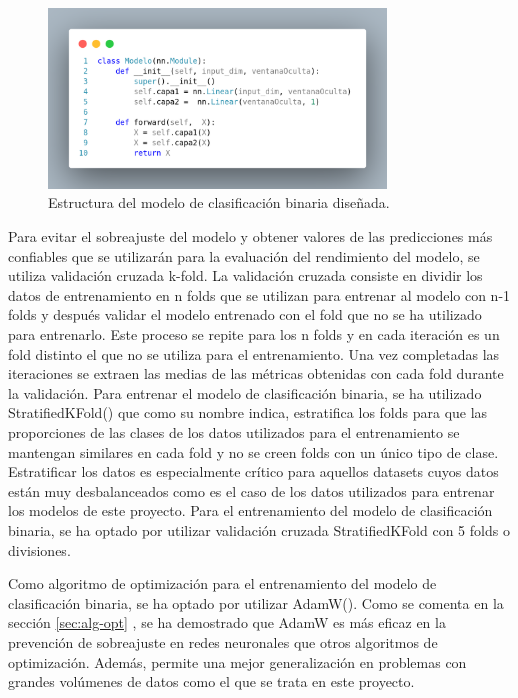 \begin{figure}[H]
    \centering
    \includegraphics[width=0.8\textwidth]{./img/modelo/modeloBIN.png}
    \caption{Estructura del modelo de clasificación binaria diseñada.}
    \label{fig:modBIN}
\end{figure}

Para evitar el sobreajuste del modelo y obtener valores de las predicciones más confiables que se utilizarán para la evaluación del rendimiento del modelo, se utiliza validación cruzada k-fold. La validación cruzada consiste en dividir los datos de entrenamiento en n folds que se utilizan para entrenar al modelo con n-1 folds y después validar el modelo entrenado con el fold que no se ha utilizado para entrenarlo. Este proceso se repite para los n folds y en cada iteración es un fold distinto el que no se utiliza para el entrenamiento. Una vez completadas las iteraciones se extraen las medias de las métricas obtenidas con cada fold durante la validación. Para entrenar el modelo de clasificación binaria, se ha utilizado StratifiedKFold() que como su nombre indica, estratifica los folds para que las proporciones de las clases de los datos utilizados para el entrenamiento se mantengan similares en cada fold y no se creen folds con un único tipo de clase. Estratificar los datos es especialmente crítico para aquellos datasets cuyos datos están muy desbalanceados como es el caso de los datos utilizados para entrenar los modelos de este proyecto. Para el entrenamiento del modelo de clasificación binaria, se ha optado por utilizar validación cruzada StratifiedKFold con 5 folds o divisiones.

Como algoritmo de optimización para el entrenamiento del modelo de clasificación binaria, se ha optado por utilizar AdamW(). Como se comenta en la sección \ref{sec:alg-opt} , se ha demostrado que AdamW es más eficaz en la prevención de sobreajuste en redes neuronales que otros algoritmos de optimización. Además, permite una mejor generalización en problemas con grandes volúmenes de datos como el que se trata en este proyecto.

